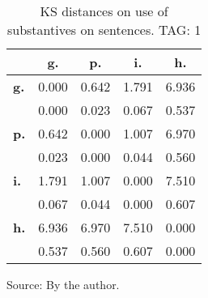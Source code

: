 \begin{table}[h!]
\begin{center}
\caption{KS distances on use of substantives on sentences. TAG: 1}
	\label{tab:kolSub}
\begin{tabular}{| l || c | c | c | c |}\hline
 & {\bf g.} & {\bf p.} & {\bf i.} & {\bf h.} \\\hline\hline
{\bf g.} & 0.000 & 0.642 & 1.791 & 6.936 \\
{\bf } & 0.000 & 0.023 & 0.067 & 0.537 \\\hline
{\bf p.} & 0.642 & 0.000 & 1.007 & 6.970 \\
{\bf } & 0.023 & 0.000 & 0.044 & 0.560 \\\hline
{\bf i.} & 1.791 & 1.007 & 0.000 & 7.510 \\
{\bf } & 0.067 & 0.044 & 0.000 & 0.607 \\\hline
{\bf h.} & 6.936 & 6.970 & 7.510 & 0.000 \\
{\bf } & 0.537 & 0.560 & 0.607 & 0.000 \\\hline
\end{tabular}
\end{center}
\begin{flushleft}\footnotesize
		Source: By the author.\
\end{flushleft}
\end{table}
